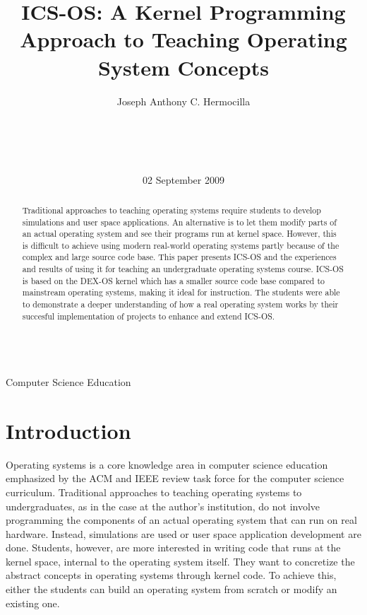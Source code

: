 \documentclass{acm_proc_article-sp}
\begin{document}
\title{ICS-OS: A Kernel Programming Approach to Teaching Operating System
Concepts}

\author{
\alignauthor
Joseph Anthony C. Hermocilla\\
       \\
       \\
       \\
       \\
}
\date{02 September 2009}

\maketitle
\begin{abstract}
Traditional approaches to teaching operating systems require students to
develop simulations and user space applications. An alternative
is to let them modify parts of an actual operating system and see their
programs run at kernel space. However, this is difficult to 
achieve using modern real-world operating systems partly because of the complex
and large source code base. This paper presents ICS-OS and the experiences and
results of using it for teaching an undergraduate operating systems course. 
ICS-OS is based on the DEX-OS kernel which has a smaller source code base
compared to mainstream operating systems, making it ideal for instruction. 
The students were able to demonstrate a deeper understanding
of how a real operating system works by their succesful implementation of
projects to enhance and extend ICS-OS.
\end{abstract}

 \\
{Computer Science Education}


\section{Introduction}
Operating systems is a core knowledge area in computer science education
emphasized by the ACM and IEEE review task force for the computer science 
curriculum. Traditional approaches to teaching operating systems to 
undergraduates, as in the case at the author's institution, do not involve 
programming the components of an actual operating system that can run on 
real hardware. Instead, simulations are used or user space application 
development are done. Students, however, are more interested in writing code
that runs at the kernel space, internal to the operating system itself. They
want to concretize the abstract concepts in operating systems through kernel
code. To achieve this, either the students can build an operating system from
scratch\cite{black:osfs} or modify an existing one.
\end{document}
